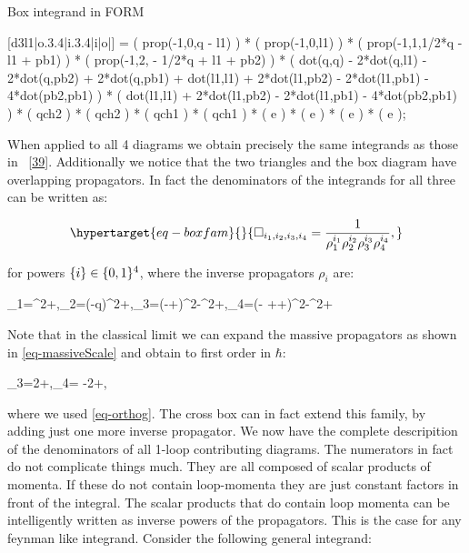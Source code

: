 \documentclass[
  10pt,
  a4paper,
  DIV=11,
  numbers=noendperiod,
  twoside]{scrreprt}
\newenvironment{Shaded}{\begin{snugshade}}{\end{snugshade}}
\newcommand{\NormalTok}[1]{\textcolor[rgb]{0.00,0.23,0.31}{#1}}
\let\[\relax \let\]\relax %
\DeclareRobustCommand{\[}{\begin{equation}}
\DeclareRobustCommand{\]}{\end{equation}}
\begin{document}
\begin{codelisting}

\caption{Box integrand in FORM}

\hypertarget{lst-formBox}{%
\label{lst-formBox}}%
\begin{Shaded}
\begin{Highlighting}[]

\NormalTok{   [d3l1|o.3.4|i.3.4|i|o|] =}
\NormalTok{         ( prop({-}1,0,q {-} l1) )}
\NormalTok{       * ( prop({-}1,0,l1) )}
\NormalTok{       * ( prop({-}1,1,1/2*q {-} l1 + pb1) )}
\NormalTok{       * ( prop({-}1,2, {-} 1/2*q + l1 + pb2) )}
\NormalTok{       * ( dot(q,q) {-} 2*dot(q,l1) {-} 2*dot(q,pb2) + 2*dot(q,pb1) + dot(l1,l1)}
\NormalTok{          + 2*dot(l1,pb2) {-} 2*dot(l1,pb1) {-} 4*dot(pb2,pb1) )}
\NormalTok{       * ( dot(l1,l1) + 2*dot(l1,pb2) {-} 2*dot(l1,pb1) {-} 4*dot(pb2,pb1) )}
\NormalTok{       * ( qch2 ) * ( qch2 ) * ( qch1 ) * ( qch1 )}
\NormalTok{       * ( e ) * ( e ) * ( e ) * ( e );}
\end{Highlighting}
\end{Shaded}

\end{codelisting}

When applied to all 4 diagrams we obtain precisely the same integrands
as those in ~{[}\protect\hyperlink{ref-Kosower:2018adc}{39}{]}.
Additionally we notice that the two triangles and the box diagram have
overlapping propagators. In fact the denominators of the integrands for
all three can be written as:

\begin{equation}\protect\hypertarget{eq-boxfam}{}{
\Box_{i_1,i_2,i_3,i_4}=\inv{\rho_1^{i_1}\rho_2^{i_2}\rho_3^{i_3}\rho_4^{i_4}},
}\label{eq-boxfam}\end{equation}

for powers \(\{i \}\in\{0,1 \}^4\), where the inverse propagators
\(\rho_i\) are:

\[
\rho_1=\ell^2+\im \epsilon,\quad \rho_2=(\ell-q)^2+\im \epsilon,\quad \rho_3=(\Half[q]-\ell+\semom[1])^2-\mass[1]^2+\im \epsilon,\quad \rho_4=(-  \Half[q]+\ell+\semom[2])^2-\mass[2]^2+\im \epsilon
\]

Note that in the classical limit we can expand the massive propagators
as shown in \ref{eq-massiveScale} and obtain to first order in
\(\hbar\):

\[
\rho_3=2\ell\cdot\semom[1]+\im \epsilon,\quad \rho_4= -2\ell\cdot\semom[2]+\im \epsilon,
\]

where we used \ref{eq-orthog}. The cross box can in fact extend this
family, by adding just one more inverse propagator. We now have the
complete descripition of the denominators of all 1-loop contributing
diagrams. The numerators in fact do not complicate things much. They are
all composed of scalar products of momenta. If these do not contain
loop-momenta they are just constant factors in front of the integral.
The scalar products that do contain loop momenta can be intelligently
written as inverse powers of the propagators. This is the case for any
feynman like integrand. Consider the following general integrand:
\end{document}
